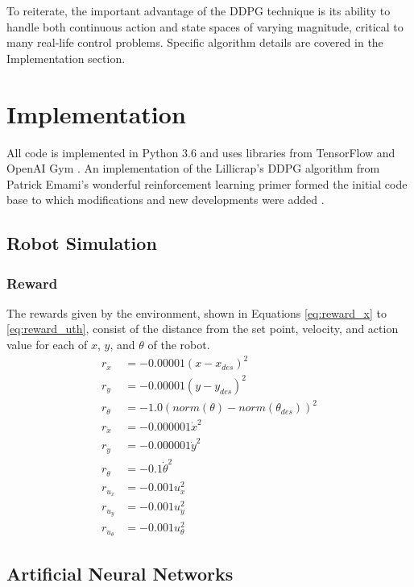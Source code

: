 To reiterate, the important advantage of the DDPG technique is its ability to handle both continuous action and state spaces of varying magnitude, critical to many real-life control problems. Specific algorithm details are covered in the Implementation section.

\section{Implementation}
All code is implemented in Python 3.6 and uses libraries from TensorFlow \cite{tensorflow} and OpenAI Gym \cite{openaigym}. An implementation of the Lillicrap's DDPG algorithm from Patrick Emami's wonderful reinforcement learning primer formed the initial code base to which modifications and new developments were added \cite{emami_2016}.

\subsection{Robot Simulation}

\subsubsection{Reward}
The rewards given by the environment, shown in Equations \ref{eq:reward_x} to \ref{eq:reward_uth}, consist of the distance from the set point, velocity, and action value for each of $x$, $y$, and $\theta$ of the robot.
\begin{align}
r_x &= -0.00001 (x-x_{des})^2 \label{eq:reward_x}\\
r_y &= -0.00001 (y-y_{des})^2 \\
r_\theta &= -1.0 (norm(\theta)-norm(\theta_{des}))^2 \\
r_{\dot{x}} &= -0.000001 \dot{x}^2 \\
r_{\dot{y}} &= -0.000001 \dot{y}^2 \\
r_{\dot{\theta}} &= -0.1 \dot{\theta}^2 \\
r_{u_x} &= -0.001u_x^2 \\
r_{u_y} &= -0.001u_y^2 \\
r_{u_\theta} &= -0.001u_\theta^2 \label{eq:reward_uth}
\end{align}

\subsection{Artificial Neural Networks}
